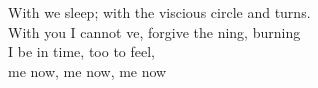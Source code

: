 With  we sleep; with  the viscious circle  and turns. \\
With you I cannot ve, forgive the ning, burning \\
I be in time, too  to feel, \\

 me now,  me now,  me now
